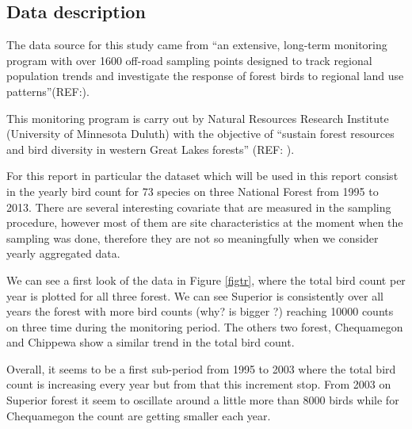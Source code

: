 \documentclass{article}
\begin{document}
\subsection{Data description}
The data source for this study came from ``an extensive, long-term monitoring program with over 1600 off-road sampling points designed to track regional population trends and investigate the response of forest birds to regional land use patterns''(REF:). 

This monitoring program is carry out by Natural Resources Research Institute (University of Minnesota Duluth) with the objective of ``sustain forest resources and bird diversity in western Great Lakes forests'' (REF: ). 

For this report in particular the dataset which will be used in this report consist in the yearly bird count for 73 species on three National Forest from 1995 to 2013. There are several interesting covariate that are measured in the sampling procedure, however most of them are site characteristics at the moment when the sampling was done, therefore they are not so meaningfully when we consider yearly aggregated data.  

We can see a first look of the data in Figure \ref{figtr}, where the total bird count per year is plotted for all three forest. We can see Superior is consistently over all years the forest with more bird counts (why? is bigger ?) reaching 10000 counts on three time during the monitoring period. The others two forest, Chequamegon and Chippewa show a similar trend in the total bird count. 


Overall, it seems to be a first sub-period from 1995 to 2003 where the total bird count is increasing every year but from that this increment stop. From 2003 on Superior forest it seem to oscillate around a little more than 8000 birds while for Chequamegon the count are getting smaller each year. 
\end{document}
